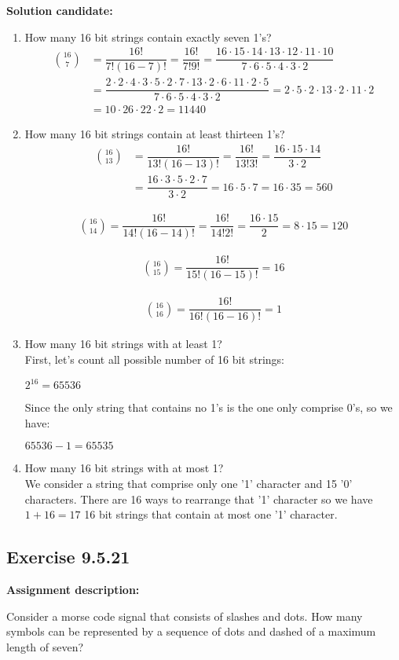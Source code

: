 \documentclass{report}
\newcommand{\cent}[1]{\begin{center}#1\end{center}}
\newcommand{\mAlign}[1]{\begin{align*}#1\end{align*}}
\newcommand{\AssignmentDescription}{\textbf{Assignment description: }}
\newcommand{\Solution}{\textbf{Solution candidate: }}
\newcommand{\Exercise}[1]{\subsection{Exercise #1}}
\newcommand{\defaultEnumerateLabel}{\textbf{\alph*.}}
\newcommand{\MyItem}[1]{\item #1\\}
\newcommand{\LetterEnumeration}[1]{\begin{enumerate}[label = \defaultEnumerateLabel]
		#1
\end{enumerate}}
\begin{document}
 	\Solution
 	
 	\LetterEnumeration{
 		\MyItem{How many 16 bit strings contain exactly seven 1's?}
 		
 		\mAlign{
 			\binom{16}{7} &= \dfrac{16!}{7!(16-7)! } = \dfrac{16!}{7!9!} = \dfrac{16 \cdot 15 \cdot 14 \cdot 13 \cdot 12 \cdot 11 \cdot 10}{7 \cdot 6 \cdot 5 \cdot 4 \cdot  3 \cdot 2}\\
 			&= \dfrac{2 \cdot 2 \cdot 4 \cdot 3 \cdot 5 \cdot 2 \cdot 7 \cdot 13 \cdot 2 \cdot 6 \cdot 11 \cdot 2 \cdot 5}{7 \cdot 6 \cdot 5 \cdot 4 \cdot  3 \cdot 2} = 2  \cdot 5 \cdot 2  \cdot 13 \cdot 2 \cdot  11 \cdot 2 \\
 			&= 10 \cdot 26 \cdot 22 \cdot 2 = 11440
 		}
 	
 	\MyItem{How many 16 bit strings contain at least thirteen 1's?}
 	
 	\mAlign{
 		\binom{16}{13} &= \dfrac{16!}{13!(16-13)!} = \dfrac{16!}{13!3!} = \dfrac{16 \cdot 15 \cdot 14}{3 \cdot 2} \\
 		&= \dfrac{16 \cdot 3 \cdot 5 \cdot 2 \cdot 7}{3 \cdot 2} = 16 \cdot  5  \cdot 7 = 16 \cdot  35 = 560
 	}
 	
 	\mAlign{
 		\binom{16}{14} = \dfrac{16!}{14!(16-14)!} = \dfrac{16!}{14!2!} = \dfrac{16 \cdot 15}{2} = 8 \cdot 15 = 120
 	}
 
	\mAlign{
		\binom{16}{15} = \dfrac{16!}{15!(16-15)!} = 16
	}

	\mAlign{
		\binom{16}{16} = \dfrac{16!}{16!(16-16)!} = 1
	}

	\MyItem{How many 16 bit strings with at least 1?}
	
	First, let's count all possible number of 16 bit strings:
	
	\cent{$2^{16}=65536$}
	
	Since the only string that contains no 1's is the one only comprise 0's, so we have:
	
	\cent{$65536 - 1 = 65535$}
 	
 	\MyItem{How many 16 bit strings with at most 1?}
 	
 	We consider a string that comprise only one '1' character and 15 '0' characters. There are 16 ways to rearrange that '1' character so we have $1+16=17$ 16 bit strings that contain at most one '1' character. 
 	}
 	
 	\Exercise{9.5.21}
 	
 	\AssignmentDescription
 	
 	Consider a morse code signal that consists of slashes and dots. How many symbols can be represented by a sequence of dots and dashed of a maximum length of seven?\\
 	 	
\end{document}
